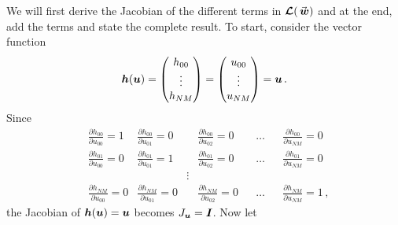 We will first derive the Jacobian of the different terms in $\euln(\wn)$ and at the end, add the terms and state the complete result. To start, consider the vector function 
\[
  \bm{h}(\bm{u}) 
  =
  \begin{pmatrix}
      h_{00} \\ \vdots \\ h_{NM} 
  \end{pmatrix}
  = 
  \begin{pmatrix}
      u_{00} \\ \vdots \\ u_{NM} 
  \end{pmatrix}
  =
  \bm{u}
  \, .
\]
Since
{\footnotesize
\begin{align*}
  &\frac{\partial h_{00}}{\partial u_{00}} = 1 %
  &\frac{\partial h_{00}}{\partial u_{01}} = 0 %
  &&\frac{\partial h_{00}}{\partial u_{02}} = 0 %
  &&\dots 
  &&\frac{\partial h_{00}}{\partial u_{NM}} = 0 %
  \\
  &\frac{\partial h_{01}}{\partial u_{00}} = 0 %
  &\frac{\partial h_{01}}{\partial u_{01}} = 1 %
  &&\frac{\partial h_{01}}{\partial u_{02}} = 0 %
  &&\dots 
  &&\frac{\partial h_{01}}{\partial u_{NM}} = 0 %
  \\
  & & & \vdots 
  \\
  &\frac{\partial h_{NM}}{\partial u_{00}} = 0 %
  &\frac{\partial h_{NM}}{\partial u_{01}} = 0 %
  &&\frac{\partial h_{NM}}{\partial u_{02}} = 0 %
  &&\dots 
  &&\frac{\partial h_{NM}}{\partial u_{NM}} = 1 %
  \, ,
\end{align*}
}
the Jacobian of $\bm{h}(\bm{u}) = \bm{u}$ becomes $J_{\bm{u}} = \bm{I}$.
Now let
